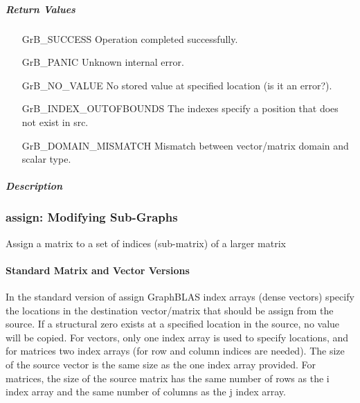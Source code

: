 \subparagraph{Return Values}

\begin{itemize}[leftmargin=2.1in]
\item[{\sf GrB\_SUCCESS}] 	          Operation completed successfully.
\item[{\sf GrB\_PANIC}]	              Unknown internal error.
\item[{\sf GrB\_NO\_VALUE}]           No stored value at specified location (is it an error?).
\item[{\sf GrB\_INDEX\_OUTOFBOUNDS}]  The indexes specify a position that does not exist in src.
\item[{\sf GrB\_DOMAIN\_MISMATCH}]    Mismatch between vector/matrix domain and scalar type.
\end{itemize}

\subparagraph{Description}




\subsubsection{{\sf assign}: Modifying Sub-Graphs}

Assign a matrix to a set of indices (sub-matrix) of a larger matrix


\paragraph{Standard Matrix and Vector Versions}

In the standard version of {\sf assign} GraphBLAS index arrays (dense vectors)
specify the locations in the destination vector/matrix that should be assign from
the source.  If a structural zero exists at a specified location in the source,
no value will be copied.  For vectors, only one index array is used to specify
locations, and for matrices two index arrays (for row and column indices are needed).
The size of the source vector is the same size as the one index array provided.
For matrices, the size of the source matrix has the same number of rows as the
{\sf i} index array and the same number of columns as the {\sf j} index array.


